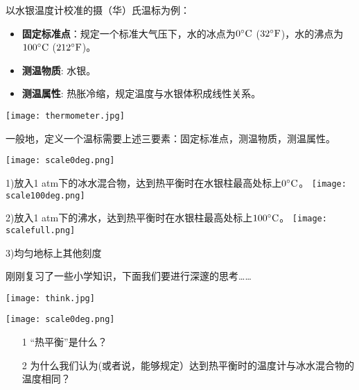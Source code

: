 \documentclass[CJK]{beamer}
\begin{document}
\begin{frame}
\bch
以水银温度计校准的摄（华）氏温标为例：
\begin{itemize}
\item{{\bf 固定标准点}：规定一个标准大气压下，水的冰点为$0^\circ \mathrm{C}$ ($32{^\circ \mathrm{F}}$)，水的沸点为$100^\circ \mathrm{C}$ ($212{^\circ \mathrm{F}}$)。}
\item{{\bf 测温物质}: 水银。}
\item{{\bf 测温属性}: 热胀冷缩，规定温度与水银体积成线性关系。} 
\end{itemize}
\emini
{}
\texttt{[image: thermometer.jpg]}
\emini

\skipline

一般地，定义一个温标需要上述三要素：固定标准点，测温物质，测温属性。
\ech
\end{frame}

\begin{frame}
\bch
{}
\texttt{[image: scale0deg.png]}

{\scriptsize 1)放入1 atm下的冰水混合物，达到热平衡时在水银柱最高处标上$0^\circ \mathrm{C}$。}
\emini
\hspace{0.1in}
\texttt{[image: scale100deg.png]}

{\vskip 0.3in}

{\scriptsize 2)放入1 atm下的沸水，达到热平衡时在水银柱最高处标上$100^\circ \mathrm{C}$。}
\emini
\hspace{0.1in}
\texttt{[image: scalefull.png]}

{\vskip 0.3in}

{\scriptsize 3)均匀地标上其他刻度

\vspace{0.36in} 

}
\emini
\ech
\end{frame}

\begin{frame}
\bch
刚刚复习了一些小学知识，下面我们要进行深邃的思考……

\begin{center}\texttt{[image: think.jpg]}\end{center}
\ech
\end{frame}


\begin{frame}
\bch
{}
\texttt{[image: scale0deg.png]}
\emini
{}
\begin{itemize}
\item[1]{ “热平衡”是什么？}
\item[2]{ 为什么我们认为(或者说，能够规定）达到热平衡时的温度计与冰水混合物的温度相同？}
\end{itemize}
\emini
\ech
\end{frame}
\end{document}
